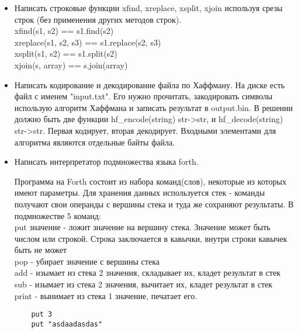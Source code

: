 \documentclass{article}
\begin{document}
\begin{itemize}
    \item Написать строковые функции xfind, xreplace, xsplit, xjoin используя срезы строк 
            (без применения других методов строк). \\
          xfind(s1, s2) == s1.find(s2) \\
          xreplace(s1, s2, s3) == s1.replace(s2, s3) \\
          xsplit(s1, s2) == s1.split(s2) \\
          xjoin(s, array) == s.join(array)

    \item Написать кодирование и декодирование файла по Хаффману. 
          На диске есть файл с именем "input.txt". 
          Его нужно прочитать, закодировать символы использую алгоритм Хаффмана
          и записать результат в output.bin. В решении должно быть две функции
          hf\_encode(string) str->str, и hf\_decode(string) str->str.
          Первая кодирует, вторая декодирует. Входными элементами для алгоритма
          являются отдельные байты файла.

    \item Написать интерпретатор подмножества языка forth. 

            Программа на Forth состоит из набора команд(слов),
            некоторые из которых имеют параметры. Для хранения данных используется стек -
            команды получают свои операнды с вершины стека и туда же сохраняют результаты.
            В  подмножестве 5 команд: \\

            put значение - ложит значение на вершину стека.
            Значение может быть числом или строкой. 
            Строка заключается в кавычки, внутри строки кавычек быть не может \\

            pop - убирает значение с вершины стека \\
            add - изымает из стека 2 значения, складывает их, кладет результат в стек\\
            sub - изымает из стека 2 значения, вычитает их, кладет результат в стек \\
            print - вынимает из стека 1 значение, печатает его. \\


\begin{verbatim}
    put 3
    put "asdaadasdas"
\end{verbatim}


\end{itemize}
\end{document}
